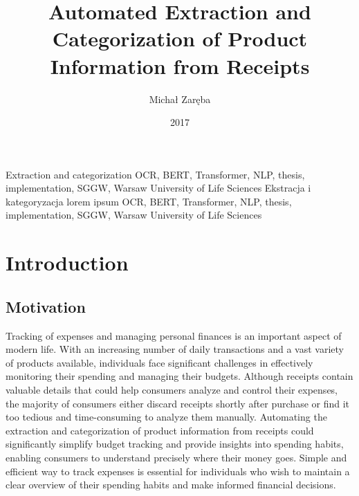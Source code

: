 \documentclass{SGGW-thesis-EN}
\title{Automated Extraction and Categorization of Product Information from Receipts}
\author{Michał Zaręba}
\date{2017}
\begin{document}
\maketitle
\statementpage
\abstractpage
{Extraction and categorization}
{}
{OCR, BERT, Transformer, NLP, thesis, implementation, SGGW, Warsaw University of Life Sciences}
{Ekstracja i kategoryzacja }
{lorem ipsum}
{OCR, BERT, Transformer, NLP, thesis, implementation, SGGW, Warsaw University of Life Sciences}



\tableofcontents


\startchapterfromoddpage %

\chapter{Introduction}

\section{Motivation}
Tracking of expenses and managing personal finances is an important aspect of modern life.
With an increasing number of daily transactions and a vast variety of products available, individuals face significant challenges in effectively monitoring their spending and managing their budgets. 
Although receipts contain valuable details that could help consumers analyze and control their expenses, 
the majority of consumers either discard receipts shortly after purchase or find it too tedious and time-consuming to analyze them manually. 
Automating the extraction and categorization of product information from receipts could significantly simplify budget tracking and provide insights into spending habits, enabling consumers to understand precisely where their money goes.
Simple and efficient way to track expenses is essential for individuals who wish to maintain a clear overview of their spending habits and make informed financial decisions. 
\end{document}

